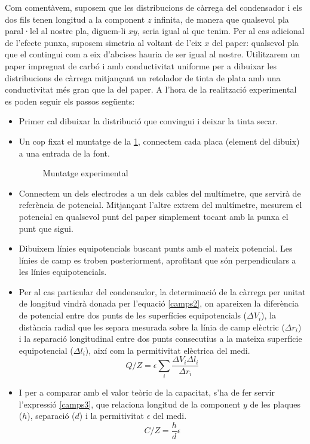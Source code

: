 Com comentàvem, suposem que les distribucions de càrrega del condensador i els dos fils tenen longitud a la component $z$ infinita, de manera que qualsevol pla paral·lel al nostre pla, diguem-li $xy$, seria igual al que tenim. Per al cas adicional de l'efecte punxa, suposem simetria al voltant de l'eix $x$ del paper: qualsevol pla que el contingui com a eix d'abcises hauria de ser igual al nostre. Utilitzarem un paper impregnat de carbó i amb conductivitat uniforme per a dibuixar les distribucions de càrrega mitjançant un retolador de tinta de plata amb una conductivitat més gran que la del paper. A l'hora de la realització experimental es poden seguir els passos següents:
\begin{itemize}
\item Primer cal dibuixar la distribució que convingui i deixar la tinta secar.
\item Un cop fixat el muntatge de la \ref{fig:muntatge}, connectem cada placa (element del dibuix) a una entrada de la font.

\begin{figure}[htb]
	\centering
	\caption{Muntatge experimental}
	\label{fig:muntatge}
\end{figure}

\item Connectem un dels electrodes a un dels cables del multímetre, que servirà de referència de potencial. Mitjançant l'altre extrem del multímetre, mesurem el potencial en qualsevol punt del paper simplement tocant amb la punxa el punt que sigui.
\item Dibuixem línies equipotencials buscant punts amb el mateix potencial. Les línies de camp es troben posteriorment, aprofitant que són perpendiculars a les línies equipotencials.
\item Per al cas particular del condensador, la determinació de la càrrega per unitat de longitud vindrà donada per l'equació \ref{camps2}, on apareixen la diferència de potencial entre dos punts de les superfícies equipotencials ($\Delta V_i$), la distància radial que les separa mesurada sobre la línia de camp elèctric
($\Delta r_i$) i la separació longitudinal entre dos punts consecutius a la mateixa superfície equipotencial ($\Delta l_i$), així com la permitivitat elèctrica del medi.
\begin{equation}\label{camps2}
Q/Z=\epsilon \sum_i \frac{\Delta V_i \Delta l_i}{\Delta r_i}
\end{equation}
\item I per a comparar amb el valor teòric de la capacitat, s'ha de fer servir l'expressió \ref{camps3}, que relaciona longitud de la component $y$ de les plaques ($h$), separació ($d$) i la permitivitat  $\epsilon$ del medi.
\begin{equation}\label{camps3} 
C/Z=\frac{h}{d}\epsilon
\end{equation}
\end{itemize}

